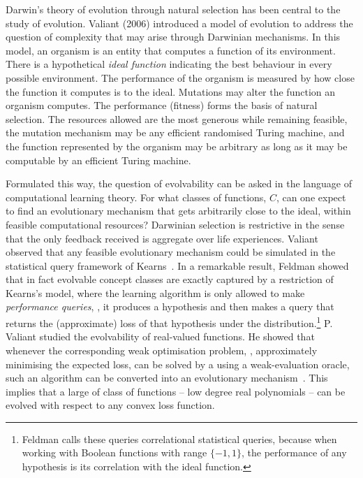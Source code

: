Darwin's theory of evolution through natural selection has been central to the
study of evolution.
Valiant (2006) introduced a model of evolution to address the question of
complexity that may arise through Darwinian mechanisms. In this model, an
organism is an entity that computes a function of its environment. There is a
hypothetical \emph{ideal function} indicating the best behaviour in every
possible environment. The performance of the organism is measured by how close
the function it computes is to the ideal. Mutations may alter the function an
organism computes. The performance (fitness) forms the basis of natural
selection. The resources allowed are the most generous while remaining feasible,
the mutation mechanism may be any efficient randomised Turing machine, and the
function represented by the organism may be arbitrary as long as it may be
computable by an efficient Turing machine.

Formulated this way, the question of evolvability can be asked in the language
of computational learning theory. For what classes of functions, $C$, can one
expect to find an evolutionary mechanism that gets arbitrarily close to the
ideal, within feasible computational resources? Darwinian selection is
restrictive in the sense that the only feedback received is aggregate over life
experiences. Valiant observed that any feasible evolutionary mechanism could be
simulated in the statistical query framework of Kearns~\cite{Kearns:1994}. In a
remarkable result, Feldman showed that in fact evolvable concept classes are
exactly captured by a restriction of Kearns's model, where the learning algorithm
is only allowed to make \emph{performance queries}, \ie, it produces a hypothesis
and then makes a query that returns the (approximate) loss of that hypothesis under the
distribution.\footnote{Feldman calls these queries correlational statistical
queries, because when working with Boolean functions with range $\{-1, 1\}$, the
performance of any hypothesis is its correlation with the ideal function.} P.
Valiant studied the evolvability of real-valued functions. He showed that
whenever the corresponding weak optimisation problem, \ie, approximately
minimising the expected loss, can be solved by a using a weak-evaluation oracle,
such an algorithm can be converted into an evolutionary
mechanism~\cite{Valiant:2012-real}. This implies that a large of class of
functions -- low degree real polynomials -- can be evolved with respect to any
convex loss function.

